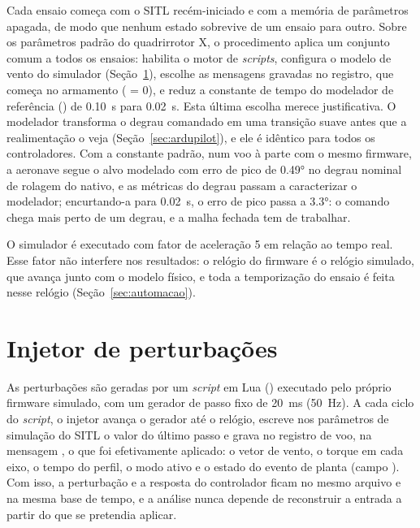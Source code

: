 Cada ensaio começa com o SITL recém-iniciado e com a memória de parâmetros
apagada, de modo que nenhum estado sobrevive de um ensaio para outro. Sobre
os parâmetros padrão do quadrirrotor X, o procedimento aplica um conjunto
comum a todos os ensaios: habilita o motor de \textit{scripts}, configura o
modelo de vento do simulador (Seção~\ref{sec:injetor}), escolhe as mensagens
gravadas no registro, que começa no armamento ( = 0),
e reduz a constante de tempo do modelador de referência
() de \SI{0.10}{\second} para \SI{0.02}{\second}. Esta
última escolha merece justificativa. O modelador transforma o degrau comandado
em uma transição suave antes que a realimentação o veja
(Seção~\ref{sec:ardupilot}), e ele é idêntico para todos os controladores.
Com a constante padrão, num voo à parte com o mesmo firmware, a aeronave
segue o alvo modelado com erro de pico de \ang{0.49} no degrau nominal de
rolagem do nativo, e as métricas do degrau passam a caracterizar o
modelador; encurtando-a para \SI{0.02}{\second}, o erro de pico passa a
\ang{3.3}: o comando chega mais perto de um degrau, e a malha fechada tem de
trabalhar.

O simulador é executado com fator de aceleração 5 em relação ao tempo real.
Esse fator não interfere nos resultados: o relógio do firmware é o relógio
simulado, que avança junto com o modelo físico, e toda a temporização do
ensaio é feita nesse relógio (Seção~\ref{sec:automacao}).

\section{Injetor de perturbações}
\label{sec:injetor}

As perturbações são geradas por um \textit{script} em Lua
() executado pelo próprio firmware simulado,
com um gerador de passo fixo de \SI{20}{\milli\second} (\SI{50}{\hertz}). A
cada ciclo do \textit{script}, o injetor avança o gerador até o relógio,
escreve nos parâmetros de simulação do SITL o valor do último passo e grava no
registro de voo, na mensagem , o que foi efetivamente aplicado: o
vetor de vento, o torque em cada eixo, o tempo do perfil, o modo ativo e o
estado do evento de planta (campo ). Com isso, a perturbação e a
resposta do controlador ficam no mesmo arquivo e na mesma base de tempo, e a
análise nunca depende de reconstruir a entrada a partir do que se pretendia
aplicar.

